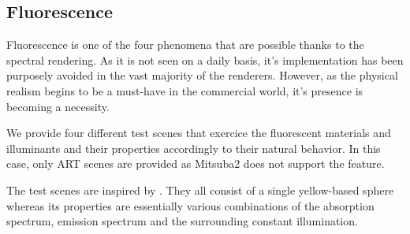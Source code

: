 \subsection{Fluorescence}

Fluorescence is one of the four phenomena that are possible thanks to the spectral rendering. As it is not seen on a daily basis, it's implementation has been purposely avoided in the vast majority of the renderers. However, as the physical realism begins to be a must-have in the commercial world, it's presence is becoming a necessity.

We provide four different test scenes that exercice the fluorescent materials and illuminants and their properties accordingly to their natural behavior. In this case, only ART scenes are provided as Mitsuba2 does not support the feature. 

The test scenes are inspired by \citet{mojzik2018handling}. They all consist of a single yellow-based sphere whereas its properties are essentially various combinations of the absorption spectrum, emission spectrum and the surrounding constant illumination.

